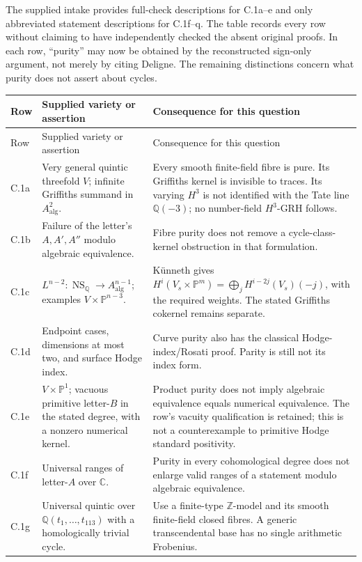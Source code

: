 The supplied intake provides full-check descriptions for C.1a--e and only abbreviated statement descriptions for C.1f--q. The table records every row without claiming to have independently checked the absent original proofs. In each row, ``purity'' may now be obtained by the reconstructed sign-only argument, not merely by citing Deligne. The remaining distinctions concern what purity does not assert about cycles.

{\small
\begin{longtable}{@{}p{}p{}p{}@{}}
\toprule
Row & Supplied variety or assertion & Consequence for this question \\
\midrule
\endfirsthead
\toprule
Row & Supplied variety or assertion & Consequence for this question \\
\midrule
\endhead
C.1a & Very general quintic threefold $V$; infinite Griffiths summand in $A^2_{\mathrm{alg}}$. & Every smooth finite-field fibre is pure. Its Griffiths kernel is invisible to traces. Its varying $H^3$ is not identified with the Tate line $\mathbb Q(-3)$; no number-field $H^3$-GRH follows. \\
C.1b & Failure of the letter's $A,A',A''$ modulo algebraic equivalence. & Fibre purity does not remove a cycle-class-kernel obstruction in that formulation. \\
C.1c & $L^{n-2}:\operatorname{NS}_{\mathbb Q}\to A^{n-1}_{\mathrm{alg}}$; examples $V\times\mathbb P^{n-3}$. & K\"unneth gives $H^i(V_s\times\mathbb P^m)=\bigoplus_j H^{i-2j}(V_s)(-j)$, with the required weights. The stated Griffiths cokernel remains separate. \\
C.1d & Endpoint cases, dimensions at most two, and surface Hodge index. & Curve purity also has the classical Hodge-index/Rosati proof. Parity is still not its index form. \\
C.1e & $V\times\mathbb P^1$; vacuous primitive letter-$B$ in the stated degree, with a nonzero numerical kernel. & Product purity does not imply algebraic equivalence equals numerical equivalence. The row's vacuity qualification is retained; this is not a counterexample to primitive Hodge standard positivity. \\
C.1f & Universal ranges of letter-$A$ over $\mathbb C$. & Purity in every cohomological degree does not enlarge valid ranges of a statement modulo algebraic equivalence. \\
C.1g & Universal quintic over $\mathbb Q(t_1,\ldots,t_{113})$ with a homologically trivial cycle. & Use a finite-type $\mathbb Z$-model and its smooth finite-field closed fibres. A generic transcendental base has no single arithmetic Frobenius. \\

\end{longtable}}
